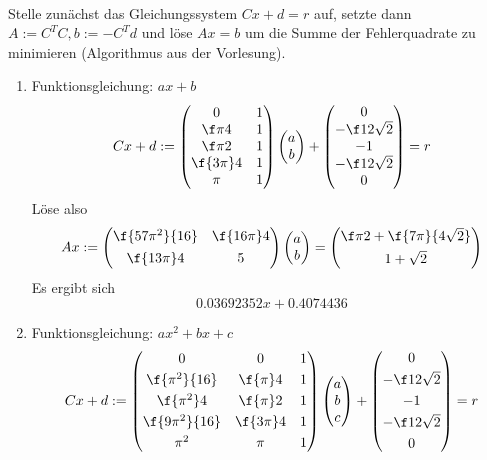 \documentclass{scrartcl}
\begin{document}
	\newpage

	\begin{aufgabe}~
		
		Stelle zunächst das Gleichungssystem $Cx+d=r$ auf, setzte dann $A:=C^TC, b:=-C^Td$ und löse $Ax=b$ um die Summe der Fehlerquadrate zu minimieren (Algorithmus aus der Vorlesung).
		\begin{enumerate}
			\item
				Funktionsgleichung: $ax+b$
				\[
					Cx+d:=\begin{pmatrix}0&1\\\f\pi4&1\\\f\pi2&1\\\f{3\pi}4&1\\\pi&1\end{pmatrix}\begin{pmatrix}a\\b\end{pmatrix} + \begin{pmatrix}0\\-\f12\sqrt2\\-1\\-\f12\sqrt{2}\\0\end{pmatrix} = r
				\]
				Löse also
				\[
					Ax:=\begin{pmatrix}\f{57\pi^2}{16} & \f{16\pi}4 \\[0.4em]\f{13\pi}4 & 5\end{pmatrix}\begin{pmatrix}a\\b\end{pmatrix} = \begin{pmatrix}\f\pi2+\f{7\pi}{4\sqrt2}\\[0.4em]1+\sqrt2\end{pmatrix}
				\]
				Es ergibt sich
				\[
					0.03692352x + 0.4074436
				\]
			\item
				Funktionsgleichung: $ax^2+bx+c$
				\[
					Cx+d:=\begin{pmatrix}0&0&1\\[0.3em]\f{\pi^2}{16}&\f{\pi}4&1\\[0.3em]\f{\pi^2}4&\f{\pi}2&1\\[0.3em]\f{9\pi^2}{16}&\f{3\pi}4&1\\[0.3em]\pi^2&\pi&1\end{pmatrix}\begin{pmatrix}a\\b\\c\end{pmatrix}+\begin{pmatrix}0\\[0.3em]-\f12\sqrt2\\[0.3em]-1\\[0.3em]-\f12\sqrt{2}\\[0.3em]0\end{pmatrix} = r
\]
\end{enumerate}
\end{aufgabe}
\end{document}

